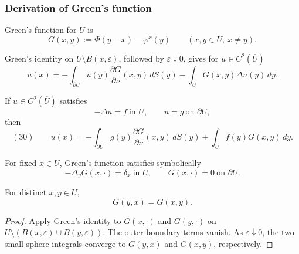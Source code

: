 \subsubsection{Derivation of Green's function}
\label{sec:laplace-greens-function-derivation}

\begin{definition}
\label{def:greens-function}
Green's function for $U$ is
$$G(x,y):=\Phi(y-x)-\varphi^x(y)
\qquad(x,y\in U,\ x\ne y).$$
\end{definition}

Green's identity on $U\setminus B(x,\varepsilon)$, followed by
$\varepsilon\downarrow0$, gives for $u\in C^2(\overline U)$
$$u(x)=-\int_{\partial U}u(y)\frac{\partial G}{\partial\nu}(x,y)\,dS(y)
-\int_U G(x,y)\Delta u(y)\,dy.$$

\begin{theorem}
\label{thm:representation-formula-greens-function}
If $u\in C^2(\overline U)$ satisfies
$$-\Delta u=f\ \text{in }U,
\qquad
u=g\ \text{on }\partial U,$$
then
$$(30)\qquad
u(x)=-\int_{\partial U}g(y)\frac{\partial G}{\partial\nu}(x,y)\,dS(y)
+\int_U f(y)G(x,y)\,dy.$$
\end{theorem}

\begin{remark}
\label{rem:greens-function-dirac-delta}
For fixed $x\in U$, Green's function satisfies symbolically
$$-\Delta_yG(x,\cdot)=\delta_x\ \text{in }U,
\qquad
G(x,\cdot)=0\ \text{on }\partial U.$$
\end{remark}

\begin{theorem}
\label{thm:greens-function-symmetry}
For distinct $x,y\in U$,
$$G(y,x)=G(x,y).$$
\end{theorem}
\begin{proof}
\sketch Apply Green's identity to $G(x,\cdot)$ and $G(y,\cdot)$ on
$U\setminus(B(x,\varepsilon)\cup B(y,\varepsilon))$. The outer boundary terms
vanish. As $\varepsilon\downarrow0$, the two small-sphere integrals converge
to $G(y,x)$ and $G(x,y)$, respectively.
\end{proof}

